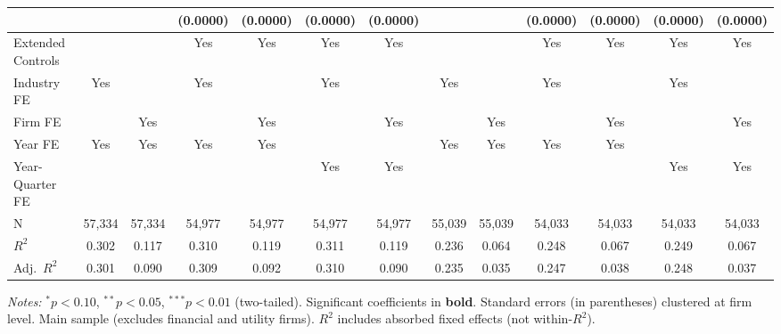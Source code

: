\documentclass[11pt,a4paper]{article}
\begin{document}
\begin{table}[htbp]
\begin{tabular}{lcccccccccccc}
 &  &  & (0.0000) & (0.0000) & (0.0000) & (0.0000) &  &  & (0.0000) & (0.0000) & (0.0000) & (0.0000) \\
\midrule
Extended Controls &  &  & Yes & Yes & Yes & Yes &  &  & Yes & Yes & Yes & Yes \\
Industry FE & Yes &  & Yes &  & Yes &  & Yes &  & Yes &  & Yes &  \\
Firm FE &  & Yes &  & Yes &  & Yes &  & Yes &  & Yes &  & Yes \\
Year FE & Yes & Yes & Yes & Yes &  &  & Yes & Yes & Yes & Yes &  &  \\
Year-Quarter FE &  &  &  &  & Yes & Yes &  &  &  &  & Yes & Yes \\
\midrule
N & 57,334 & 57,334 & 54,977 & 54,977 & 54,977 & 54,977 & 55,039 & 55,039 & 54,033 & 54,033 & 54,033 & 54,033 \\
$R^2$ & 0.302 & 0.117 & 0.310 & 0.119 & 0.311 & 0.119 & 0.236 & 0.064 & 0.248 & 0.067 & 0.249 & 0.067 \\
Adj.~$R^2$ & 0.301 & 0.090 & 0.309 & 0.092 & 0.310 & 0.090 & 0.235 & 0.035 & 0.247 & 0.038 & 0.248 & 0.037 \\
\bottomrule
\end{tabular}
\begin{minipage}{\linewidth}
\vspace{2pt}\scriptsize
\textit{Notes:} $^{*}p<0.10$, $^{**}p<0.05$, $^{***}p<0.01$ (two-tailed).
 Significant coefficients in \textbf{bold}.
 Standard errors (in parentheses) clustered at firm level.
 Main sample (excludes financial and utility firms).
 $R^2$ includes absorbed fixed effects (not within-$R^2$).
\end{minipage}
\end{table}
\clearpage
\end{document}
